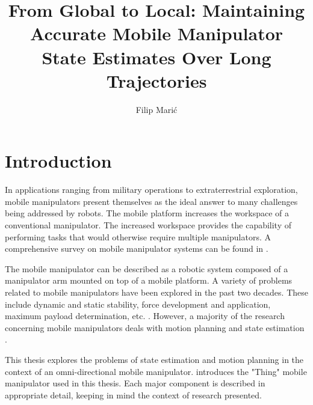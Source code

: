 \documentclass[times, utf8, diplomski, english]{fer}
\begin{document}

\title{From Global to Local: Maintaining Accurate Mobile Manipulator State Estimates Over Long Trajectories}

\author{Filip Marić}

\maketitle

\izvornik


\tableofcontents

\chapter{Introduction}
In applications ranging from military operations to extraterrestrial exploration, mobile manipulators present themselves as the ideal answer to many challenges being addressed by robots.
The mobile platform increases the workspace of a conventional manipulator.
The increased workspace provides the capability of performing tasks that would otherwise require multiple manipulators.
A comprehensive survey on mobile manipulator systems can be found in \citep{bloch2003nonholonomic}.

The mobile manipulator can be described as a robotic system composed of a manipulator arm mounted on top of a mobile platform.
A variety of problems related to mobile manipulators have been explored in the past two decades. 
These include dynamic and static stability, force development and application, maximum payload determination, etc. \citep{papadopoulos1999framework,korayem2004analysis}.
However, a majority of the research concerning mobile manipulators deals with motion planning and state estimation \citep{yamamoto1992coordinating,korayem2012mathematical}.
 
This thesis explores the problems of state estimation and motion planning in the context of an omni-directional mobile manipulator.
 introduces the "Thing" mobile manipulator used in this thesis.
Each major component is described in appropriate detail, keeping in mind the context of research presented.
\end{document}
